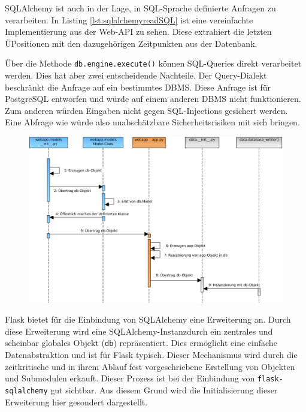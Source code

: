 SQLAlchemy ist auch in der Lage, in SQL-Sprache definierte Anfragen zu verarbeiten. In Listing \ref{lst:sqlalchemyreadSQL} ist eine vereinfachte Implementierung aus der Web-API zu sehen. Diese extrahiert die letzten ÜPositionen mit den dazugehörigen Zeitpunkten aus der Datenbank. 

    
Über die Methode \texttt{db.engine.execute()} können SQL-Queries direkt verarbeitet werden. Dies hat aber zwei entscheidende Nachteile. Der Query-Dialekt beschränkt die Anfrage auf ein bestimmtes DBMS. Diese Anfrage ist für PostgreSQL entworfen und würde auf einem anderen DBMS nicht funktionieren. Zum anderen würden Eingaben nicht gegen SQL-Injections gesichert werden. Eine Abfrage wie 
 würde also unabschätzbare Sicherheitsrisiken mit sich bringen.
\\


\begin{figure}[H]
 \centering
 \includegraphics[width=\textwidth]{pix/seq_db.png}
 \label{fig:sequenzSQLALCHEMY}
\end{figure}

Flask bietet für die Einbindung von SQLAlchemy eine Erweiterung an. 
Durch diese Erweiterung wird eine SQLAlchemy-Instanzdurch ein zentrales und scheinbar globales Objekt (\texttt{db}) repräsentiert. Dies ermöglicht eine einfache Datenabstraktion und ist für Flask typisch. Dieser Mechanismus wird durch die zeitkritische und in ihrem Ablauf fest vorgeschriebene Erstellung von Objekten und Submodulen erkauft.
Dieser Prozess ist bei der Einbindung von \texttt{flask-sqlalchemy} gut sichtbar. Aus diesem Grund wird die Initialisierung dieser Erweiterung hier gesondert dargestellt.

